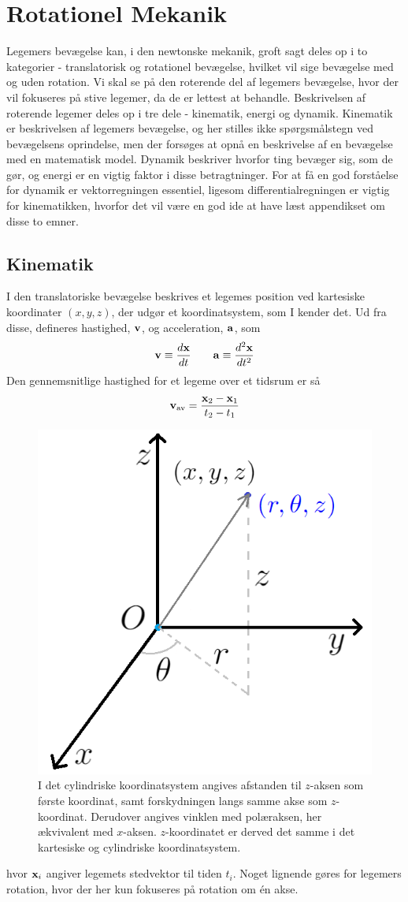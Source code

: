 \chapter{Rotationel Mekanik}
Legemers bevægelse kan, i den newtonske mekanik, groft sagt deles op i to kategorier - translatorisk og rotationel bevægelse, hvilket vil sige bevægelse med og uden rotation. Vi skal se på den roterende del af legemers bevægelse, hvor der vil fokuseres på stive legemer, da de er lettest at behandle. Beskrivelsen af roterende legemer deles op i tre dele - kinematik, energi og dynamik. Kinematik er beskrivelsen af legemers bevægelse, og her stilles ikke spørgsmålstegn ved bevægelsens oprindelse, men der forsøges at opnå en beskrivelse af en bevægelse med en matematisk model. Dynamik beskriver hvorfor ting bevæger sig, som de gør, og energi er en vigtig faktor i disse betragtninger. For at få en god forståelse for dynamik er vektorregningen essentiel, ligesom differentialregningen er vigtig for kinematikken, hvorfor det vil være en god ide at have læst appendikset om disse to emner.

\section{Kinematik}
I den translatoriske bevægelse beskrives et legemes position ved kartesiske koordinater $(x,y,z)$, der udgør et koordinatsystem, som I kender det. Ud fra disse, defineres hastighed, $\mathbf{v}$, og acceleration, $\mathbf{a}$, som
\begin{equation}
    \mathbf{v} \equiv {d{\ensuremath{\mathbf{x}}} \over d{t}} \qquad \mathbf{a} \equiv {d^2{\ensuremath{\mathbf{x}}} \over d{t}^2}
\end{equation}
Den gennemsnitlige hastighed for et legeme over et tidsrum er så
\begin{equation}
    \mathbf{v}_{\text{av}} = \frac{\mathbf{x}_2-\mathbf{x}_1}{t_2-t_1}
\end{equation}
\begin{figure}[h!]
\centering
\includegraphics[width=.35\textwidth]{RotationelMekanik/CylindriskeKoordinater}
\caption{I det cylindriske koordinatsystem angives afstanden til $z$-aksen som første koordinat, samt forskydningen langs samme akse som $z$-koordinat. Derudover angives vinklen med polæraksen, her ækvivalent med $x$-aksen. $z$-koordinatet er derved det samme i det kartesiske og cylindriske koordinatsystem.}
\label{fig:CylindriskeKoordinater}
\end{figure}
hvor $\mathbf{x}_i$ angiver legemets stedvektor til tiden $t_i$. Noget lignende gøres for legemers rotation, hvor der her kun fokuseres på rotation om én akse.


